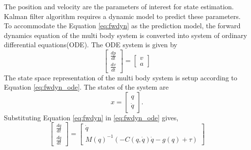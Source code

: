 The position and velocity are the parameters of interest for state estimation. Kalman filter algorithm requires a dynamic model to predict these parameters. To accommodate the Equation \ref{eq:fwdyn} as the prediction model, the forward dynamics equation of the multi body system is converted into system of ordinary differential equations(ODE). The ODE system is given by
\begin{equation}
    \label{eq:fwdyn_ode}
    \begin{bmatrix} \frac{dp}{dt}  \\ \frac{dv}{dt} \end{bmatrix} = 
    \begin{bmatrix} v \\ a \end{bmatrix}
\end{equation}
 The state space representation of the multi body system is setup according to Equation \ref{eq:fwdyn_ode}. The states of the system are
\begin{equation}
    x = \begin{bmatrix} q \\ \dot q \end{bmatrix}.
\end{equation}
Substituting Equation \ref{eq:fwdyn} in \ref{eq:fwdyn_ode} gives, 
\begin{equation}
    \label{eq:dyn_ss}
    \begin{bmatrix} \frac{dq}{dt} \\ \frac{d \dot q}{dt} \end{bmatrix} =
    \begin{bmatrix}
    \dot q \\
    M(q)^{-1} \left( -C(q,\dot{q})\dot{q} - g(q) + \tau \right )
    \end{bmatrix}
\end{equation}


